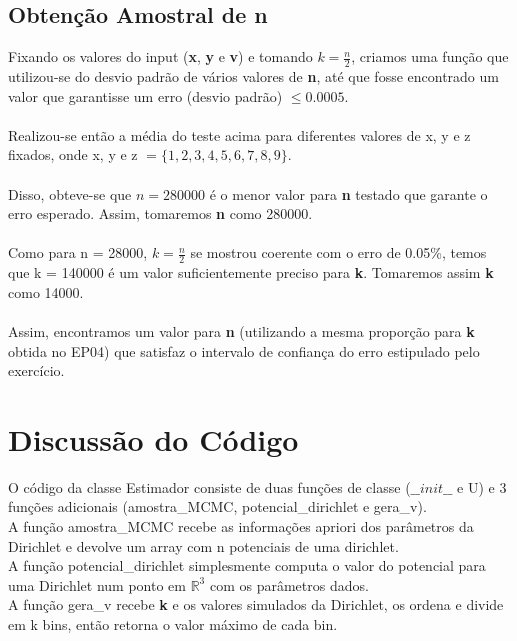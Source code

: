 \documentclass{article}
\begin{document}
\subsection{Obtenção Amostral de n}
    Fixando os valores do input (\textbf{x}, \textbf{y} e \textbf{v}) e tomando $k = \frac{n}{2}$, criamos uma função que utilizou-se do desvio padrão de vários valores de \textbf{n}, até que fosse encontrado um valor que garantisse um erro (desvio padrão) $\leq 0.0005$.\\
    \\
    Realizou-se então a média do teste acima para diferentes valores de x, y e z fixados, onde x, y e z $= \{1,2,3,4,5,6,7,8,9\}$.\\
    \\
    Disso, obteve-se que $n = 280000 $ é o menor valor para \textbf{n} testado que garante o erro esperado. Assim, tomaremos \textbf{n} como 280000.\\
    \\
    Como para n = 28000, $k = \frac{n}{2}$ se mostrou coerente com o erro de 0.05\%, temos que k = 140000 é um valor suficientemente preciso para \textbf{k}. Tomaremos assim \textbf{k} como 14000.\\
    \\
    Assim, encontramos um valor para \textbf{n} (utilizando a mesma proporção para \textbf{k} obtida no EP04) que satisfaz o intervalo de confiança do erro estipulado pelo exercício.

\section{Discussão do Código}

    O código da classe Estimador consiste de duas funções de classe ($\_\_init\_\_$ e U) e 3 funções adicionais (amostra\_MCMC, potencial\_dirichlet e gera\_v).\\
    
    A função amostra\_MCMC recebe as informações apriori dos parâmetros da Dirichlet e devolve um array com n potenciais de uma dirichlet.\\
    
    A função potencial\_dirichlet simplesmente computa o valor do potencial para uma Dirichlet num ponto em $\mathbb{R}^3$ com os parâmetros dados.\\
    
    A função gera\_v recebe \textbf{k} e os valores simulados da Dirichlet, os ordena e divide em k bins, então retorna o valor máximo de cada bin.\\
    
\end{document}

